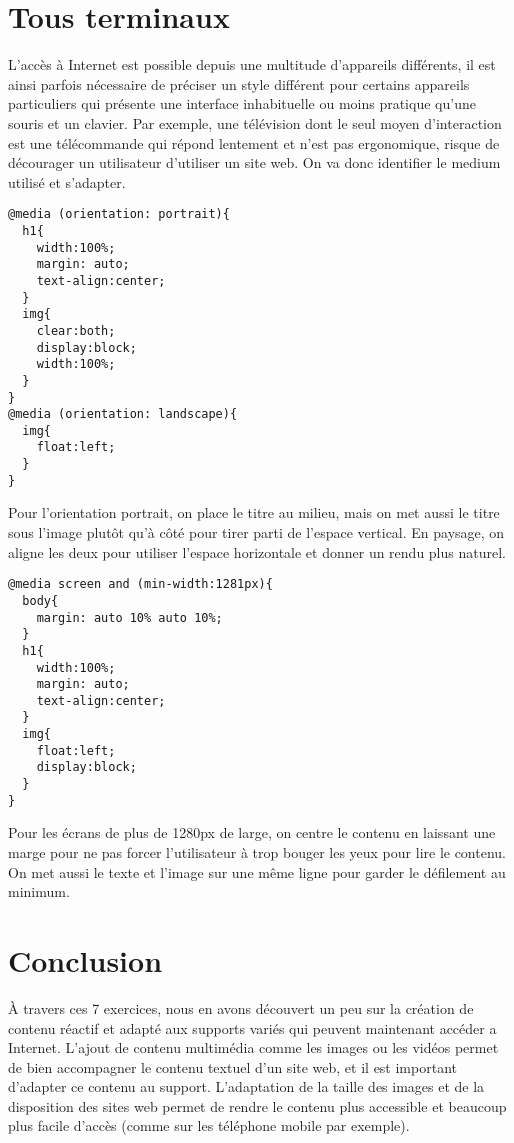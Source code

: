 \section{Tous terminaux}
L'accès à Internet est possible depuis une multitude d'appareils différents, il est ainsi parfois nécessaire de préciser un style différent pour certains appareils particuliers qui présente une interface inhabituelle ou moins pratique qu'une souris et un clavier. Par exemple, une télévision dont le seul moyen d'interaction est une télécommande qui répond lentement et n'est pas ergonomique, risque de décourager un utilisateur d'utiliser un site web. On va donc identifier le medium utilisé et s'adapter.
\begin{verbatim}
@media (orientation: portrait){
  h1{
    width:100%;
    margin: auto;
    text-align:center;
  }
  img{
    clear:both;
    display:block;
    width:100%;
  }
}
@media (orientation: landscape){
  img{
    float:left;
  }
}
\end{verbatim}
Pour l'orientation portrait, on place le titre au milieu, mais on met aussi le titre sous l'image plutôt qu'à côté pour tirer parti de l'espace vertical. En paysage, on aligne les deux pour utiliser l'espace horizontale et donner un rendu plus naturel.
\begin{verbatim}
@media screen and (min-width:1281px){
  body{
    margin: auto 10% auto 10%;
  }
  h1{
    width:100%;
    margin: auto;
    text-align:center;
  }
  img{
    float:left;
    display:block;
  }
}
\end{verbatim}
Pour les écrans de plus de 1280px de large, on centre le contenu en laissant une marge pour ne pas forcer l'utilisateur à trop bouger les yeux pour lire le contenu. On met aussi le texte et l'image sur une même ligne pour garder le défilement au minimum.
\section{Conclusion}
À travers ces 7 exercices, nous en avons découvert un peu sur la création de contenu réactif et adapté aux supports variés qui peuvent maintenant accéder a Internet. L'ajout de contenu multimédia comme les images ou les vidéos permet de bien accompagner le contenu textuel d'un site web, et il est important d'adapter ce contenu au support. L'adaptation de la taille des images et de la disposition des sites web permet de rendre le contenu plus accessible et beaucoup plus facile d'accès (comme sur les téléphone mobile par exemple).
